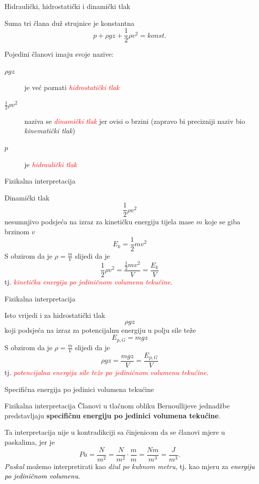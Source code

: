 \documentclass[croatian]{beamer}
\begin{document}
\begin{frame}{Hidraulički, hidrostatički i dinamički tlak}

Suma tri člana duž strujnice je konstantna
\[
p+\rho gz+\frac{1}{2}\rho v^{2}=konst.
\]
\begin{block}{Pojedini članovi imaju svoje nazive:}
\begin{description}
\item [{$\rho gz$}] je već poznati \textcolor{red}{\emph{hidrostatički
tlak}}
\item [{$\frac{1}{2}\rho v^{2}$}] naziva se \textcolor{red}{\emph{dinamički
tlak}} jer ovisi o brzini (zapravo bi precizniji naziv bio \emph{kinematički
tlak})
\item [{$p$}] je \textcolor{red}{\emph{hidraulički tlak}}
\end{description}
\end{block}
\end{frame}

\begin{frame}{Fizikalna interpretacija}

Dinamički tlak
\[
\frac{1}{2}\rho v^{2}
\]
nesumnjivo podsjeća na izraz za kinetičku energiju tijela mase $m$
koje se giba brzinom $v$
\[
E_{k}=\frac{1}{2}mv^{2}
\]
S obzirom da je $\rho=\frac{m}{V}$ slijedi da je
\[
\frac{1}{2}\rho v^{2}=\frac{\frac{1}{2}mv^{2}}{V}=\frac{E_{k}}{V}
\]
tj. \textcolor{red}{\emph{kinetička energija po jediničnom volumenu
tekućine}}.
\end{frame}

\begin{frame}{Fizikalna interpretacija}

Isto vrijedi i za hidrostatički tlak
\[
\rho gz
\]
koji podsjeća na izraz za potencijalnu energiju u polju sile teže
\[
E_{p,G}=mgz
\]
S obzirom da je $\rho=\frac{m}{V}$ slijedi da je
\[
\rho gz=\frac{mgz}{V}=\frac{E_{p,G}}{V}
\]
tj. \textcolor{red}{\emph{potencijalna energija sile teže po jediničnom
volumenu tekućine}}.

\end{frame}

\begin{frame}{Specifična energija po jedinici volumena tekućine}

\begin{alertblock}{Fizikalna interpretacija}
 Članovi u tlačnom obliku Bernoullijeve jednadžbe predstavljaju \textbf{specifičnu
energiju po jedinici volumena tekućine}.
\end{alertblock}

Ta interpretacija nije u kontradikciji sa činjenicom da se članovi
mjere u paskalima, jer je
\[
Pa=\frac{N}{m^{2}}=\frac{N}{m^{2}}\cdot\frac{m}{m}=\frac{Nm}{m^{3}}=\frac{J}{m^{3}}.
\]
\emph{Paskal} možemo interpretirati kao \emph{džul po kubnom metru},
tj. kao mjeru za \textcolor{black}{\emph{energiju po jediničnom volumenu}}.
\end{frame}
\end{document}
